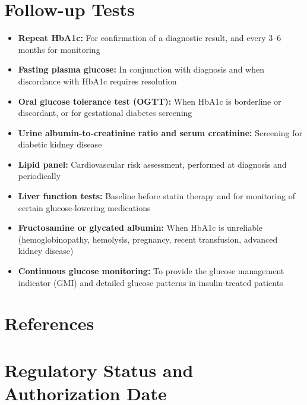 \section*{Follow-up Tests}
\begin{itemize}
  \item \textbf{Repeat HbA1c:} For confirmation of a diagnostic result, and every 3--6 months for monitoring
  \item \textbf{Fasting plasma glucose:} In conjunction with diagnosis and when discordance with HbA1c requires resolution
  \item \textbf{Oral glucose tolerance test (OGTT):} When HbA1c is borderline or discordant, or for gestational diabetes screening
  \item \textbf{Urine albumin-to-creatinine ratio and serum creatinine:} Screening for diabetic kidney disease
  \item \textbf{Lipid panel:} Cardiovascular risk assessment, performed at diagnosis and periodically
  \item \textbf{Liver function tests:} Baseline before statin therapy and for monitoring of certain glucose-lowering medications
  \item \textbf{Fructosamine or glycated albumin:} When HbA1c is unreliable (hemoglobinopathy, hemolysis, pregnancy, recent transfusion, advanced kidney disease)
  \item \textbf{Continuous glucose monitoring:} To provide the glucose management indicator (GMI) and detailed glucose patterns in insulin-treated patients
\end{itemize}

\section*{References}



\clearpage
\section*{Regulatory Status and Authorization Date}

\clearpage
